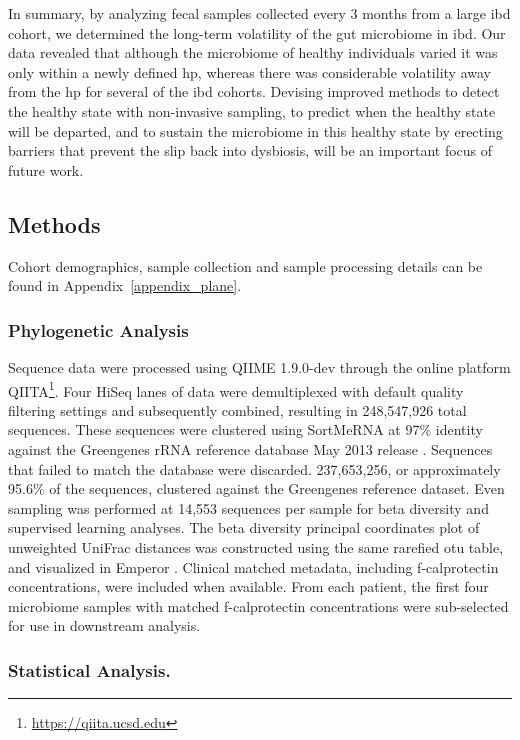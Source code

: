 In summary, by analyzing fecal samples collected every 3 months from a large \gls{ibd} cohort, we determined the long-term volatility of the gut microbiome in \gls{ibd}. Our data revealed that although the microbiome of healthy individuals varied it was only within a newly defined \gls{hp}, whereas there was considerable volatility away from the \gls{hp} for several of the \gls{ibd} cohorts. Devising improved methods to detect the healthy state with non-invasive sampling, to predict when the healthy state will be departed, and to sustain the microbiome in this healthy state by erecting barriers that prevent the slip back into dysbiosis, will be an important focus of future work.


\subsection{Methods}

Cohort demographics, sample collection and sample processing details can be 
found in Appendix~\ref{appendix_plane}.

\subsubsection{Phylogenetic Analysis}

Sequence data were processed using QIIME 1.9.0-dev through the online platform QIITA\footnote{\url{https://qiita.ucsd.edu}}\cite{RN110}. Four HiSeq lanes of data were demultiplexed with default quality filtering settings and subsequently combined, resulting in 248,547,926 total sequences. These sequences were clustered using SortMeRNA at 97\% identity against the Greengenes rRNA reference database May 2013 release \cite{RN3810,RN165}. Sequences that failed to match the database were discarded. 237,653,256, or approximately 95.6\% of the sequences, clustered against the Greengenes reference dataset. Even sampling was performed at 14,553 sequences per sample for beta diversity and supervised learning analyses. The beta diversity principal coordinates plot of unweighted UniFrac distances was constructed using the same rarefied \gls{otu} table, and visualized in Emperor \cite{RN83,RN79}. Clinical matched metadata, including f-calprotectin concentrations, were included when available. From each patient, the first four microbiome samples with matched f-calprotectin concentrations were sub-selected for use in downstream analysis. 

\subsubsection{Statistical Analysis.}

